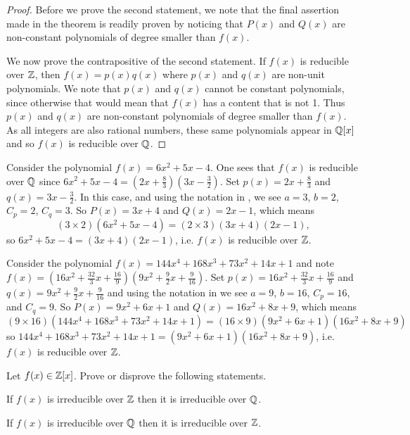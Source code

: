 \begin{proof}
    Before we prove the second statement, we note that the final assertion made in the theorem is readily proven by noticing that $P(x)$ and $Q(x)$ are non-constant polynomials of degree smaller than $f(x)$.

    We now prove the contrapositive of the second statement. If $f(x)$ is reducible over $\mathbb{Z}$, then $f(x) = p(x)q(x)$ where $p(x)$ and $q(x)$ are non-unit polynomials. We note that $p(x)$ and $q(x)$ cannot be constant polynomials, since otherwise that would mean that $f(x)$ has a content that is not 1. Thus $p(x)$ and $q(x)$ are non-constant polynomials of degree smaller than $f(x)$. As all integers are also rational numbers, these same polynomials appear in $\mathbb{Q}[x]$ and so $f(x)$ is reducible over $\mathbb{Q}$.
\end{proof}

\begin{example}
    Consider the polynomial $f(x) = 6x^2 + 5x - 4$. One sees that $f(x)$ is reducible over $\mathbb{Q}$ since $6x^2 + 5x - 4 = \left(2x + \frac83\right)\left(3x - \frac32\right)$. Set $p(x) = 2x + \frac83$ and $q(x) = 3x - \frac32$. In this case, and using the notation in , we see $a = 3$, $b = 2$, $C_p = 2$, $C_q = 3$. So $P(x) = 3x + 4$ and $Q(x) = 2x - 1$, which means
    \[
        (3\times2)(6x^2 + 5x - 4) = (2\times3)(3x+4)(2x-1),
    \]
    so $6x^2 + 5x - 4 = (3x+4)(2x-1)$, i.e. $f(x)$ is reducible over $\mathbb{Z}$.
\end{example}

\begin{example}
    Consider the polynomial $f(x) = 144x^4 + 168x^3 + 73x^2 + 14x + 1$ and note $f(x) = \left(16x^2 + \frac{32}3x + \frac{16}9\right)\left(9x^2 + \frac92x + \frac9{16}\right)$. Set $p(x) = 16x^2 + \frac{32}3x + \frac{16}9$ and $q(x) = 9x^2 + \frac92x + \frac9{16}$ and using the notation in  we see $a = 9$, $b = 16$, $C_p = 16$, and $C_q = 9$. So $P(x) = 9x^2+6x+1$ and $Q(x) = 16x^2 + 8x + 9$, which means
    \[
        (9 \times 16)\left(144x^4 + 168x^3 + 73x^2 + 14x + 1\right) = (16 \times 9)(9x^2+6x+1)(16x^2 + 8x + 9)
    \]
    so $144x^4 + 168x^3 + 73x^2 + 14x + 1 = (9x^2+6x+1)(16x^2 + 8x + 9)$, i.e. $f(x)$ is reducible over $\mathbb{Z}$.
\end{example}

\begin{exercise}
    Let $f(x) \in \mathbb{Z}[x]$. Prove or disprove the following statements.
    \begin{partquestions}{\alph*}
        \item If $f(x)$ is irreducible over $\mathbb{Z}$ then it is irreducible over $\mathbb{Q}$.
        \item If $f(x)$ is irreducible over $\mathbb{Q}$ then it is irreducible over $\mathbb{Z}$.
    \end{partquestions}
\end{exercise}

